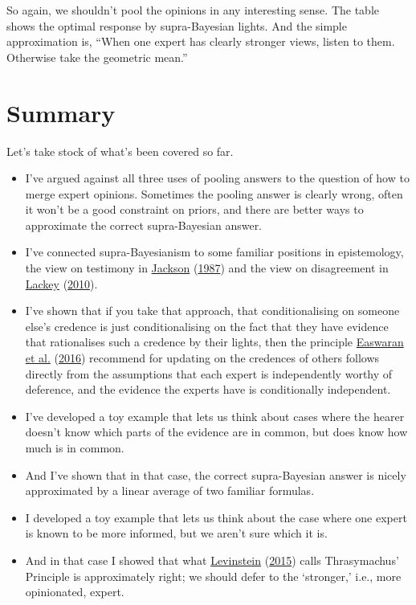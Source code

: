 \documentclass[
  12pt,
]{article}
\providecommand{\tightlist}{%
  \setlength{\itemsep}{0pt}\setlength{\parskip}{0pt}}
\begin{document}
So again, we shouldn't pool the opinions in any interesting sense. The
table shows the optimal response by supra-Bayesian lights. And the
simple approximation is, ``When one expert has clearly stronger views,
listen to them. Otherwise take the geometric mean.''

\hypertarget{summary}{%
\section{Summary}\label{summary}}

Let's take stock of what's been covered so far.

\begin{itemize}
\tightlist
\item
  I've argued against all three uses of pooling answers to the question
  of how to merge expert opinions. Sometimes the pooling answer is
  clearly wrong, often it won't be a good constraint on priors, and
  there are better ways to approximate the correct supra-Bayesian
  answer.
\item
  I've connected supra-Bayesianism to some familiar positions in
  epistemology, the view on testimony in
  \protect\hyperlink{ref-Jackson1987}{Jackson}
  (\protect\hyperlink{ref-Jackson1987}{1987}) and the view on
  disagreement in \protect\hyperlink{ref-Lackey2010-LACWSW}{Lackey}
  (\protect\hyperlink{ref-Lackey2010-LACWSW}{2010}).
\item
  I've shown that if you take that approach, that conditionalising on
  someone else's credence is just conditionalising on the fact that they
  have evidence that rationalises such a credence by their lights, then
  the principle \protect\hyperlink{ref-EaswaranEtAl2016}{Easwaran et
  al.} (\protect\hyperlink{ref-EaswaranEtAl2016}{2016}) recommend for
  updating on the credences of others follows directly from the
  assumptions that each expert is independently worthy of deference, and
  the evidence the experts have is conditionally independent.
\item
  I've developed a toy example that lets us think about cases where the
  hearer doesn't know which parts of the evidence are in common, but
  does know how much is in common.
\item
  And I've shown that in that case, the correct supra-Bayesian answer is
  nicely approximated by a linear average of two familiar formulas.
\item
  I developed a toy example that lets us think about the case where one
  expert is known to be more informed, but we aren't sure which it is.
\item
  And in that case I showed that what
  \protect\hyperlink{ref-Levinstein2015}{Levinstein}
  (\protect\hyperlink{ref-Levinstein2015}{2015}) calls Thrasymachus'
  Principle is approximately right; we should defer to the `stronger,'
  i.e., more opinionated, expert.
\end{itemize}
\end{document}
